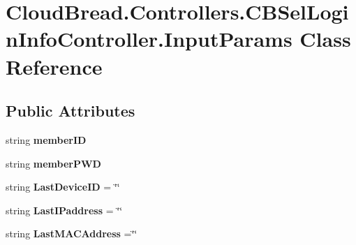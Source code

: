\hypertarget{class_cloud_bread_1_1_controllers_1_1_c_b_sel_login_info_controller_1_1_input_params}{}\section{Cloud\+Bread.\+Controllers.\+C\+B\+Sel\+Login\+Info\+Controller.\+Input\+Params Class Reference}
\label{class_cloud_bread_1_1_controllers_1_1_c_b_sel_login_info_controller_1_1_input_params}
\subsection*{Public Attributes}
\begin{DoxyCompactItemize}
\item 
string {\bfseries member\+ID}\hypertarget{class_cloud_bread_1_1_controllers_1_1_c_b_sel_login_info_controller_1_1_input_params_ada7036881426d4d249d51783fed5c968}{}\label{class_cloud_bread_1_1_controllers_1_1_c_b_sel_login_info_controller_1_1_input_params_ada7036881426d4d249d51783fed5c968}

\item 
string {\bfseries member\+P\+WD}\hypertarget{class_cloud_bread_1_1_controllers_1_1_c_b_sel_login_info_controller_1_1_input_params_a63889974827c41cd33c147821d097fcf}{}\label{class_cloud_bread_1_1_controllers_1_1_c_b_sel_login_info_controller_1_1_input_params_a63889974827c41cd33c147821d097fcf}

\item 
string {\bfseries Last\+Device\+ID} = \char`\"{}\char`\"{}\hypertarget{class_cloud_bread_1_1_controllers_1_1_c_b_sel_login_info_controller_1_1_input_params_a198ab2e794a4e4fc05e89c9f984ba4a1}{}\label{class_cloud_bread_1_1_controllers_1_1_c_b_sel_login_info_controller_1_1_input_params_a198ab2e794a4e4fc05e89c9f984ba4a1}

\item 
string {\bfseries Last\+I\+Paddress} = \char`\"{}\char`\"{}\hypertarget{class_cloud_bread_1_1_controllers_1_1_c_b_sel_login_info_controller_1_1_input_params_ad02b24584c0f2ef0e6fbcf4e9098dc0e}{}\label{class_cloud_bread_1_1_controllers_1_1_c_b_sel_login_info_controller_1_1_input_params_ad02b24584c0f2ef0e6fbcf4e9098dc0e}

\item 
string {\bfseries Last\+M\+A\+C\+Address} =\char`\"{}\char`\"{}\hypertarget{class_cloud_bread_1_1_controllers_1_1_c_b_sel_login_info_controller_1_1_input_params_a1513dd40a1c1d3b83584d18415b3ca6d}{}\label{class_cloud_bread_1_1_controllers_1_1_c_b_sel_login_info_controller_1_1_input_params_a1513dd40a1c1d3b83584d18415b3ca6d}

\end{DoxyCompactItemize}


